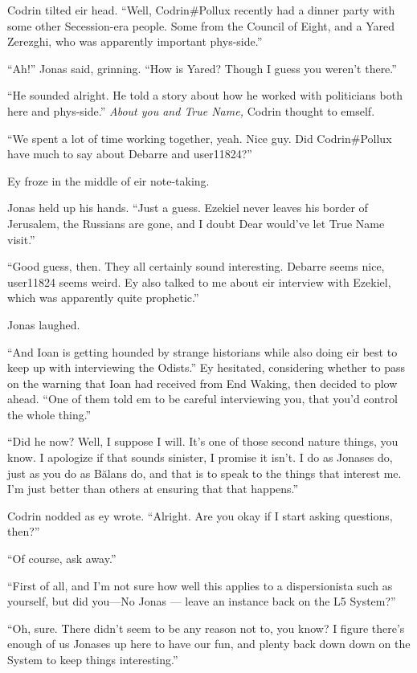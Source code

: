 Codrin tilted eir head. ``Well, Codrin\#Pollux recently had a dinner party with some other Secession-era people. Some from the Council of Eight, and a Yared Zerezghi, who was apparently important phys-side.''

``Ah!'' Jonas said, grinning. ``How is Yared? Though I guess you weren't there.''

``He sounded alright. He told a story about how he worked with politicians both here and phys-side.'' \emph{About you and True Name,} Codrin thought to emself.

``We spent a lot of time working together, yeah. Nice guy. Did Codrin\#Pollux have much to say about Debarre and user11824?''

Ey froze in the middle of eir note-taking.

Jonas held up his hands. ``Just a guess. Ezekiel never leaves his border of Jerusalem, the Russians are gone, and I doubt Dear would've let True Name visit.''

``Good guess, then. They all certainly sound interesting. Debarre seems nice, user11824 seems weird. Ey also talked to me about eir interview with Ezekiel, which was apparently quite prophetic.''

Jonas laughed.

``And Ioan is getting hounded by strange historians while also doing eir best to keep up with interviewing the Odists.'' Ey hesitated, considering whether to pass on the warning that Ioan had received from End Waking, then decided to plow ahead. ``One of them told em to be careful interviewing you, that you'd control the whole thing.''

``Did he now? Well, I suppose I will. It's one of those second nature things, you know. I apologize if that sounds sinister, I promise it isn't. I do as Jonases do, just as you do as Bălans do, and that is to speak to the things that interest me. I'm just better than others at ensuring that that happens.''

Codrin nodded as ey wrote. ``Alright. Are you okay if I start asking questions, then?''

``Of course, ask away.''

``First of all, and I'm not sure how well this applies to a dispersionista such as yourself, but did you---No Jonas — leave an instance back on the L5 System?''

``Oh, sure. There didn't seem to be any reason not to, you know? I figure there's enough of us Jonases up here to have our fun, and plenty back down down on the System to keep things interesting.''

